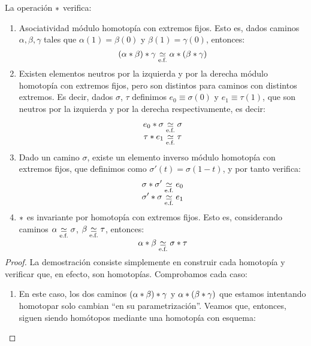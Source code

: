 \begin{lem}
	\label{grf_lema_prop_pathp}
	La operación ${\mathbin{*}}$ verifica:
	\begin{enumerate}
		\item Asociatividad módulo homotopía con extremos fijos. Esto es, dados caminos $\alpha,\beta,\gamma$ tales que $\alpha(1)=\beta(0)$ y $\beta(1)=\gamma(0)$, entonces:
		\[(\alpha\mathbin{*}\beta)\mathbin{*}\gamma\mathrel{\smash{\underset{\text{e.f.}}{\simeq}}}\alpha\mathbin{*}(\beta\mathbin{*}\gamma)\]
		
		\item Existen elementos neutros por la izquierda y por la derecha módulo homotopía con extremos fijos, pero son distintos para caminos con distintos extremos. Es decir, dados $\sigma$, $\tau$ definimos $e_0\equiv\sigma(0)$ y $e_1 \equiv\tau(1)$, que son neutros por la izquierda y por la derecha respectivamente, es decir:
		\begin{gather*}
			e_0\mathbin{*}\sigma \mathrel{\smash{\underset{\text{e.f.}}{\simeq}}} \sigma \\
			\tau\mathbin{*} e_1\mathrel{\smash{\underset{\text{e.f.}}{\simeq}}}\tau
		\end{gather*}
		
		\item Dado un camino $\sigma$, existe un elemento inverso módulo homotopía con extremos fijos, que definimos como $\sigma'(t)=\sigma(1-t)$, y por tanto verifica:
		\begin{gather*}
		\sigma\mathbin{*}\sigma' \mathrel{\smash{\underset{\text{e.f.}}{\simeq}}} e_0 \\
		\sigma'\mathbin{*}\sigma \mathrel{\smash{\underset{\text{e.f.}}{\simeq}}} e_1
		\end{gather*}
		
		\item ${\mathbin{*}}$ es invariante por homotopía con extremos fijos. Esto es, considerando caminos $\alpha\mathrel{\smash{\underset{\text{e.f.}}{\simeq}}}\sigma$, $\beta\mathrel{\smash{\underset{\text{e.f.}}{\simeq}}}\tau$, entonces:
		\[\alpha\mathbin{*}\beta\mathrel{\smash{\underset{\text{e.f.}}{\simeq}}} \sigma\mathbin{*}\tau\]
	\end{enumerate}

	\begin{proof}
		La demostración consiste simplemente en construir cada homotopía y verificar que, en efecto, son homotopías. Comprobamos cada caso:
		
		\begin{enumerate}
			\item En este caso, los dos caminos $(\alpha\mathbin{*}\beta)\mathbin{*}\gamma$ y $\alpha\mathbin{*}(\beta\mathbin{*}\gamma)$ que estamos intentando homotopar solo cambian ``en su parametrización''. Veamos que, entonces, siguen siendo homótopos mediante una homotopía con esquema:
			

\end{enumerate}
\end{proof}
\end{lem}

